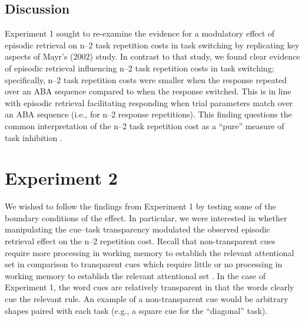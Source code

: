 \documentclass[a4paper, doc, natbib]{apa6}
\begin{document}
\subsection{Discussion}
Experiment 1 sought to re-examine the evidence for a modulatory effect of episodic retrieval on n--2 task repetition costs in task switching by replicating key aspects of Mayr's (2002) study. In contrast to that study, we found clear evidence of episodic retrieval influencing n--2 task repetition costs in task switching; specifically, n--2 task repetition costs were smaller when the response repeated over an ABA sequence compared to when the response switched. This is in line with episodic retrieval facilitating responding when trial parameters match over an ABA sequence (i.e., for n--2 response repetitions). This finding questions the common interpretation of the n--2 task repetition cost as a ``pure'' measure of task inhibition \citep{Koch2010, Mayr2007}.

\section{Experiment 2}
We wished to follow the findings from Experiment 1 by testing some of the boundary conditions of the effect. In particular, we were interested in whether manipulating the cue--task transparency modulated the observed episodic retrieval effect on the n--2 repetition cost. Recall that non-transparent cues require more processing in working memory to establish the relevant attentional set in comparison to transparent cues which require little or no processing in working memory to establish the relevant attentional set \citep[e.g.,][]{Grange2009, Grange2010, Grange2015a, Houghton2009, Mayr2000a}. In the case of Experiment 1, the word cues are relatively transparent in that the words clearly cue the relevant rule. An example of a non-transparent cue would be arbitrary shapes paired with each task (e.g., a square cue for the ``diagonal'' task). 
\end{document}
